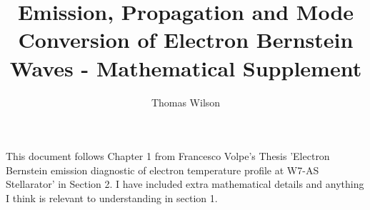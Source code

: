 \documentclass[a4paper, 12pt]{article}
\begin{document}
\title{Emission, Propagation and Mode Conversion of Electron Bernstein Waves - Mathematical Supplement}
\author{Thomas Wilson}
\maketitle{}
This document follows Chapter 1 from Francesco Volpe's Thesis 'Electron Bernstein emission diagnostic of electron temperature profile at W7-AS Stellarator' in Section 2. I have included extra mathematical details and anything I think is relevant to understanding in section 1.











\end{document}
